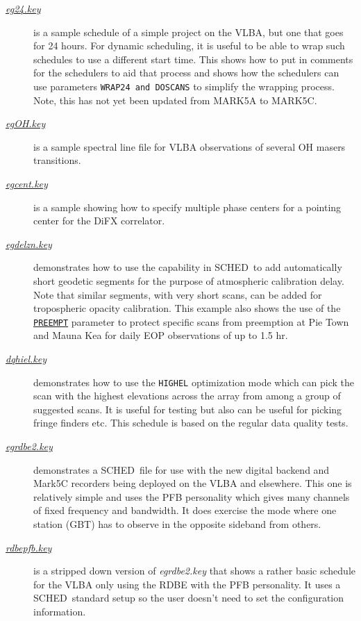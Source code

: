\documentclass{report}
\newcommand{\schedb}{{\sc SCHED~}}
\begin{document}
\begin{description}
\item[
{\href{examples/eg24.key}{{\sl eg24.key}}}] is a
sample schedule of a simple project on the VLBA, but one that goes
for 24 hours.  For dynamic scheduling, it is useful to be able to
wrap such schedules to use a different start time.  This shows how
to put in comments for the schedulers to aid that process and shows
how the schedulers can use parameters {\tt WRAP24 and DOSCANS} to
simplify the wrapping process.  Note, this has not yet been updated
from MARK5A to MARK5C.

\item[
{\href{examples/egOH.key}{{\sl egOH.key}}}] is a
sample spectral line file for VLBA
observations of several OH masers transitions.

\item[
{\href{examples/egcent.key}{{\sl egcent.key}}}] is
a sample showing how to specify multiple phase centers for a pointing
center for the DiFX correlator.

\item[
{\href{examples/egdelzn.key}{{\sl egdelzn.key}}}]
demonstrates how to use the capability in \schedb to add automatically
short geodetic segments for the purpose of atmospheric calibration
delay.  Note that similar segments, with very short scans, can be added
for tropospheric opacity calibration.  This example also shows the use
of the 
{\hyperref[MP:PREEMPT]{{\tt PREEMPT}}} parameter to protect
specific scans from preemption at Pie Town and Mauna Kea for daily
EOP observations of up to 1.5 hr.

\item[
{\href{examples/dqhiel.key}{{\sl dqhiel.key}}}]
demonstrates how to use the {\tt HIGHEL} optimization mode which can
pick the scan with the highest elevations across the array from among
a group of suggested scans.  It is useful for testing but also can be
useful for picking fringe finders etc.  This schedule is based on 
the regular data quality tests.

\item[
{\href{examples/egrdbe2.key}{{\sl egrdbe2.key}}}]
demonstrates a \schedb file for use with the new digital backend and
Mark5C recorders being deployed on the VLBA and elsewhere.  This one
is relatively simple and uses the PFB personality which gives many
channels of fixed frequency and bandwidth.  It does exercise the
mode where one station (GBT) has to observe in the opposite sideband
from others.

\item[
{\href{examples/rdbepfb.key}{{\sl rdbepfb.key}}}]
is a stripped down version of {\sl egrdbe2.key} that shows a rather
basic schedule for the VLBA only using the RDBE with the PFB personality.
It uses a \schedb standard setup so the user doesn't need to set
the configuration information.


\end{description}
\end{document}
